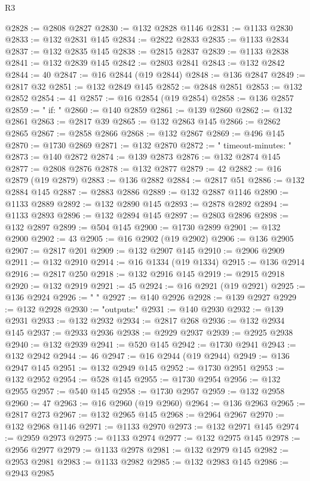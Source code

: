 \begin{lexlean}{R3}
\begin{coremodule}
@2828 := @2808 @2827
@2830 := @132 @2828 @1146
@2831 := @1133 @2830
@2833 := @132 @2831 @145
@2834 := @2822 @2833
@2835 := @1133 @2834
@2837 := @132 @2835 @145
@2838 := @2815 @2837
@2839 := @1133 @2838
@2841 := @132 @2839 @145
@2842 := @2803 @2841
@2843 := @132 @2842
@2844 := 40
@2847 := @16 @2844 (@19 @2844)
@2848 := @136 @2847
@2849 := @2817 @32
@2851 := @132 @2849 @145
@2852 := @2848 @2851
@2853 := @132 @2852
@2854 := 41
@2857 := @16 @2854 (@19 @2854)
@2858 := @136 @2857
@2859 := "    if: "
@2860 := @140 @2859
@2861 := @139 @2860
@2862 := @132 @2861
@2863 := @2817 @39
@2865 := @132 @2863 @145
@2866 := @2862 @2865
@2867 := @2858 @2866
@2868 := @132 @2867
@2869 := @496 @145
@2870 := @1730 @2869
@2871 := @132 @2870
@2872 := "    timeout-minutes: "
@2873 := @140 @2872
@2874 := @139 @2873
@2876 := @132 @2874 @145
@2877 := @2808 @2876
@2878 := @132 @2877
@2879 := 42
@2882 := @16 @2879 (@19 @2879)
@2883 := @136 @2882
@2884 := @2817 @51
@2886 := @132 @2884 @145
@2887 := @2883 @2886
@2889 := @132 @2887 @1146
@2890 := @1133 @2889
@2892 := @132 @2890 @145
@2893 := @2878 @2892
@2894 := @1133 @2893
@2896 := @132 @2894 @145
@2897 := @2803 @2896
@2898 := @132 @2897
@2899 := @504 @145
@2900 := @1730 @2899
@2901 := @132 @2900
@2902 := 43
@2905 := @16 @2902 (@19 @2902)
@2906 := @136 @2905
@2907 := @2817 @201
@2909 := @132 @2907 @145
@2910 := @2906 @2909
@2911 := @132 @2910
@2914 := @16 @1334 (@19 @1334)
@2915 := @136 @2914
@2916 := @2817 @250
@2918 := @132 @2916 @145
@2919 := @2915 @2918
@2920 := @132 @2919
@2921 := 45
@2924 := @16 @2921 (@19 @2921)
@2925 := @136 @2924
@2926 := "    "
@2927 := @140 @2926
@2928 := @139 @2927
@2929 := @132 @2928
@2930 := "outputs:"
@2931 := @140 @2930
@2932 := @139 @2931
@2933 := @132 @2932
@2934 := @2817 @268
@2936 := @132 @2934 @145
@2937 := @2933 @2936
@2938 := @2929 @2937
@2939 := @2925 @2938
@2940 := @132 @2939
@2941 := @520 @145
@2942 := @1730 @2941
@2943 := @132 @2942
@2944 := 46
@2947 := @16 @2944 (@19 @2944)
@2949 := @136 @2947 @145
@2951 := @132 @2949 @145
@2952 := @1730 @2951
@2953 := @132 @2952
@2954 := @528 @145
@2955 := @1730 @2954
@2956 := @132 @2955
@2957 := @540 @145
@2958 := @1730 @2957
@2959 := @132 @2958
@2960 := 47
@2963 := @16 @2960 (@19 @2960)
@2964 := @136 @2963
@2965 := @2817 @273
@2967 := @132 @2965 @145
@2968 := @2964 @2967
@2970 := @132 @2968 @1146
@2971 := @1133 @2970
@2973 := @132 @2971 @145
@2974 := @2959 @2973
@2975 := @1133 @2974
@2977 := @132 @2975 @145
@2978 := @2956 @2977
@2979 := @1133 @2978
@2981 := @132 @2979 @145
@2982 := @2953 @2981
@2983 := @1133 @2982
@2985 := @132 @2983 @145
@2986 := @2943 @2985

\end{coremodule}
\end{lexlean}
